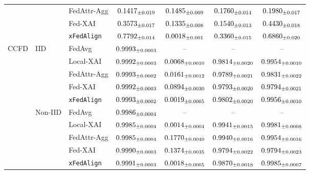 \documentclass{article}
\newcommand{\meanstd}[2]{#1\textsubscript{\scriptsize$\pm$#2}}
\theoremstyle{plain}
\theoremstyle{definition}
\theoremstyle{remark}
\begin{document}
\begin{table}[t]
{\begin{tabular}{lllcccc}
 &  & FedAttr-Agg
     & $\meanstd{0.1417}{0.019}$ & $\meanstd{0.1485}{0.009}$ & $\meanstd{0.1760}{0.014}$ & $\meanstd{0.1980}{0.017}$ \\
 &  & Fed-XAI    
     & $\meanstd{0.3573}{0.017}$ & $\meanstd{0.1335}{0.008}$ & $\meanstd{0.1540}{0.013}$ & $\meanstd{0.4430}{0.018}$ \\
 &  & \texttt{xFedAlign}  
     & $\meanstd{0.7792}{0.014}$ & $\meanstd{0.0018}{0.001}$ & $\meanstd{0.3360}{0.015}$ & $\meanstd{0.6860}{0.020}$ \\
\midrule
\multirow{10}{*}{CCFD}
 & \multirow{5}{*}{IID}
   & FedAvg      
     & $\meanstd{0.9993}{0.0003}$ & --                      & --                      & --                      \\
 &  & Local-XAI   
     & $\meanstd{0.9992}{0.0003}$ & $\meanstd{0.0068}{0.0010}$ & $\meanstd{0.9814}{0.0020}$ & $\meanstd{0.9954}{0.0010}$ \\
 &  & FedAttr-Agg
     & $\meanstd{0.9993}{0.0002}$ & $\meanstd{0.0161}{0.0012}$ & $\meanstd{0.9789}{0.0021}$ & $\meanstd{0.9831}{0.0022}$ \\
 &  & Fed-XAI    
     & $\meanstd{0.9992}{0.0003}$ & $\meanstd{0.0894}{0.0030}$ & $\meanstd{0.9793}{0.0020}$ & $\meanstd{0.9794}{0.0021}$ \\
 &  & \texttt{xFedAlign}  
     & $\meanstd{0.9993}{0.0002}$ & $\meanstd{0.0019}{0.0005}$ & $\meanstd{0.9802}{0.0020}$ & $\meanstd{0.9956}{0.0010}$ \\
\cmidrule(lr){2-7}
 & \multirow{5}{*}{Non-IID}
   & FedAvg      
     & $\meanstd{0.9986}{0.0004}$ & --                      & --                      & --                      \\
 &  & Local-XAI   
     & $\meanstd{0.9985}{0.0004}$ & $\meanstd{0.0014}{0.0004}$ & $\meanstd{0.9941}{0.0015}$ & $\meanstd{0.9981}{0.0008}$ \\
 &  & FedAttr-Agg
     & $\meanstd{0.9985}{0.0004}$ & $\meanstd{0.1770}{0.0040}$ & $\meanstd{0.9940}{0.0016}$ & $\meanstd{0.9954}{0.0016}$ \\
 &  & Fed-XAI    
     & $\meanstd{0.9990}{0.0003}$ & $\meanstd{0.1374}{0.0035}$ & $\meanstd{0.9794}{0.0022}$ & $\meanstd{0.9794}{0.0023}$ \\
 &  & \texttt{xFedAlign}  
     & $\meanstd{0.9991}{0.0003}$ & $\meanstd{0.0018}{0.0005}$ & $\meanstd{0.9870}{0.0018}$ & $\meanstd{0.9985}{0.0007}$ \\
\bottomrule
\end{tabular}
}
\end{table}
\end{document}
